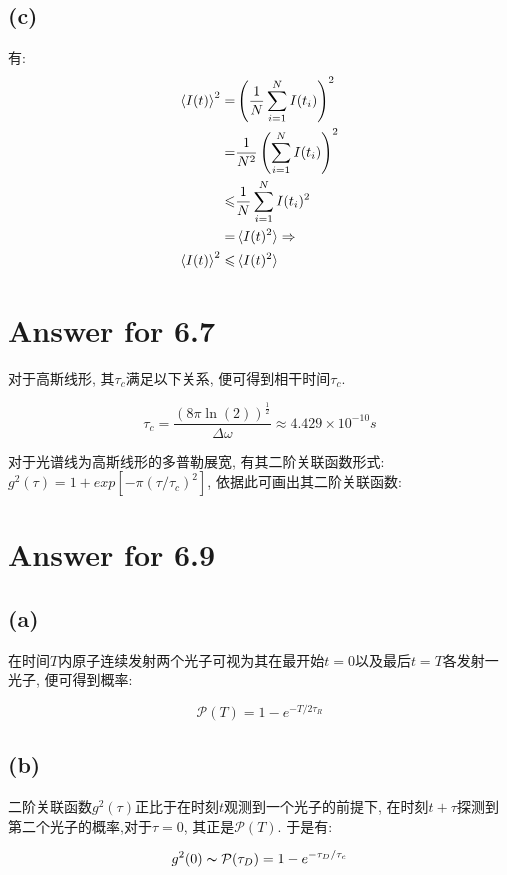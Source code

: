 \documentclass[twoside]{article}
\begin{document}
\subsection*{(c)}

有:
\begin{equation*}
    \begin{split}
        \braket{I(t)}^2 =          & \left(\frac{1}{N} \sum_{i=1}^{N} I(t_i) \right)^2  \\
        =                          & \frac{1}{N^2} \left(\sum_{i=1}^{N} I(t_i)\right)^2 \\
        \leqslant                  & \frac{1}{N} \sum_{i=1}^{N} I(t_i)^2                \\
        =                          & \braket{I(t)^2} \Rightarrow                        \\
        \braket{I(t)}^2  \leqslant & \braket{I(t)^2}
    \end{split}
\end{equation*}


\clearpage

\section*{Answer for 6.7}

对于高斯线形, 其$\tau_c$满足以下关系, 便可得到相干时间$\tau_c$.

\begin{equation*}
    \tau_c = \frac{\left(8\pi \ln(2)\right)^\frac{1}{2}}{\Delta \omega} \approx 4.429 \times 10^{-10} s
\end{equation*}


对于光谱线为高斯线形的多普勒展宽, 有其二阶关联函数形式:$g^2(\tau) = 1+ exp\left[-\pi\left(\tau/\tau_c\right)^2\right]$, 依据此可画出其二阶关联函数:

\begin{figure}[h!]
    \begin{center}
        
    \end{center}
\end{figure}

\section*{Answer for 6.9}

\subsection*{(a)}

在时间$T$内原子连续发射两个光子可视为其在最开始$t=0$以及最后$t=T$各发射一光子, 便可得到概率:

$$\mathcal{P}(T) = 1 - e^{-T/2\tau_R}$$

\subsection*{(b)}

二阶关联函数$g^2(\tau)$正比于在时刻$t$观测到一个光子的前提下, 在时刻$t+\tau$探测到第二个光子的概率,对于$\tau = 0$, 其正是$\mathcal{P}(T)$.
于是有:

$$
    g^2(0) \thicksim  \mathcal{P}(\tau_D) = 1 - e^{-\tau_D/\tau_c}
$$
\end{document}
